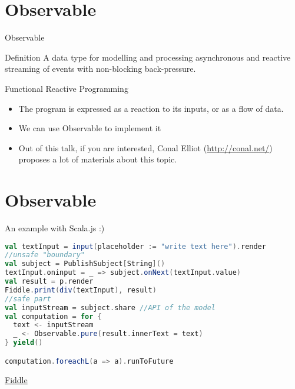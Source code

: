 \documentclass[presentation]{beamer}
\let\oldcite\cite
\renewcommand{\cite}[1]{{\color{blue}\oldcite{#1}}}
\begin{document}
\section{Observable}
\begin{frame}[fragile]{Observable}
\begin{block}{Definition}
A data type for modelling and processing asynchronous and reactive streaming of events with non-blocking back-pressure.
\end{block}
\begin{block}{Functional Reactive Programming \cite{wiki:functional} \cite{blackheath2016functional}}
\begin{itemize}
\item The program is expressed as a reaction to its inputs, or as a flow of data.
\item We can use Observable to implement it
\item Out of this talk, if you are interested, Conal Elliot (\url{http://conal.net/}) proposes a lot of materials about this topic.
\end{itemize}
\end{block}
\end{frame}
\section{Observable}
\begin{frame}[fragile]{An example with Scala.js :)}
\begin{lstlisting}[language=Scala]
val textInput = input(placeholder := "write text here").render
//unsafe "boundary"
val subject = PublishSubject[String]() 
textInput.oninput = _ => subject.onNext(textInput.value)
val result = p.render
Fiddle.print(div(textInput), result)
//safe part
val inputStream = subject.share //API of the model
val computation = for {
  text <- inputStream
  _ <- Observable.pure(result.innerText = text)
} yield()

computation.foreachL(a => a).runToFuture
\end{lstlisting}  
\begin{center}
\href{https://scalafiddle.io/sf/0uDr1Cr/1}{Fiddle}
\end{center}
\end{frame}
\end{document}
